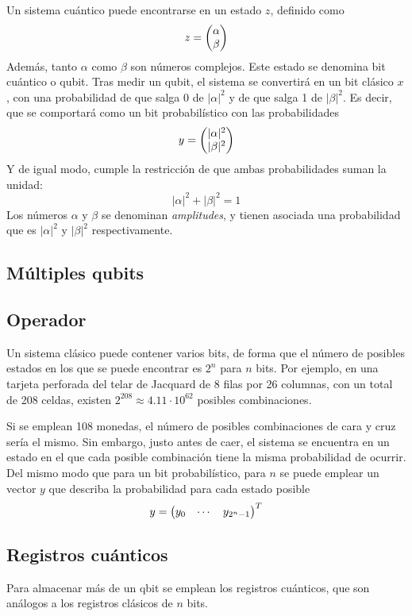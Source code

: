 Un sistema cuántico puede encontrarse en un estado $z$, definido como
%
$$ z = \begin{pmatrix} \alpha \\ \beta \end{pmatrix}$$
%
Además, tanto $\alpha$ como $\beta$ son números complejos. Este estado se 
denomina bit cuántico o qubit.
%
Tras medir un qubit, el sistema se convertirá en un bit clásico $x$, con una 
probabilidad de que salga 0 de $|\alpha|^2$ y de que salga 1 de $|\beta|^2$.
Es decir, que se comportará como un bit probabilístico con las probabilidades
%
$$ y = \begin{pmatrix} |\alpha|^2 \\ |\beta|^2 \end{pmatrix}$$
%
Y de igual modo, cumple la restricción de que ambas probabilidades suman la 
unidad:
%
$$ |\alpha|^2 + |\beta|^2 = 1 $$
%
Los números $\alpha$ y $\beta$ se denominan \textit{amplitudes}, y tienen 
asociada una probabilidad que es $|\alpha|^2$ y $|\beta|^2$ respectivamente.

\subsection{Múltiples qubits}

\subsection{Operador}

Un sistema clásico puede contener varios bits, de forma que el número de 
posibles estados en los que se puede encontrar es $2^n$ para $n$ bits. Por 
ejemplo, en una tarjeta perforada del telar de Jacquard de $8$ filas por 26 
columnas, con un total de 208 celdas, existen $2^{208} \approx 
4.11 \cdot 10^{62}$ posibles combinaciones.

Si se emplean 108 monedas, el número de posibles combinaciones de cara y cruz 
sería el mismo. Sin embargo, justo antes de caer, el sistema se encuentra en un 
estado en el que cada posible combinación tiene la misma probabilidad de 
ocurrir. Del mismo modo que para un bit probabilístico, para $n$ se puede 
emplear un vector $y$ que describa la probabilidad para cada estado posible
$$
	y = \begin{pmatrix} y_0 & \cdots & y_{2^n-1} \end{pmatrix}^T
$$

\subsection{Registros cuánticos}
Para almacenar más de un qbit se emplean los registros cuánticos, que son 
análogos a los registros clásicos de $n$ bits.

